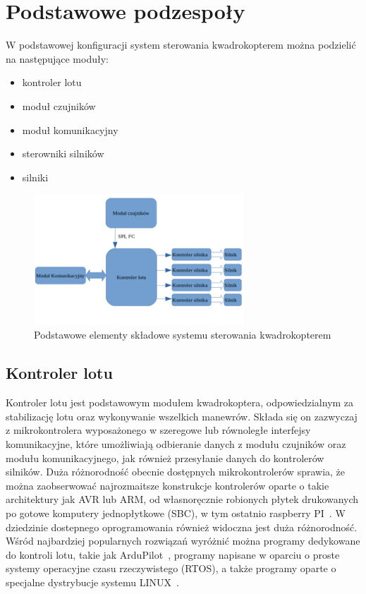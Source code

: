 \section{Podstawowe podzespoły}

W podstawowej konfiguracji system sterowania kwadrokopterem można podzielić na następujące moduły:
\begin{itemize}
	\item{kontroler lotu}
	\item{moduł czujników}
	\item{moduł komunikacyjny}
	\item{sterowniki silników}
	\item{silniki}
\end{itemize}

\begin{figure}[H]
	\centering
		\includegraphics[width=0.7\textwidth]{Pictures/quadrotor_modules.png}
	\caption[Podstawowe moduły kwawdrokoptera]{Podstawowe elementy składowe systemu sterowania kwadrokopterem}
	\label{fig:quadrotor_modules.png}
\end{figure}

\subsection{Kontroler lotu}

Kontroler lotu jest podstawowym modułem kwadrokoptera, odpowiedzialnym za stabilizację lotu oraz wykonywanie wszelkich manewrów. Składa się on zazwyczaj z mikrokontrolera wyposażonego w szeregowe lub równoległe interfejsy komunikacyjne, które umożliwiają odbieranie danych z modułu czujników oraz modułu komunikacyjnego, jak również przesyłanie danych do kontrolerów silników. Duża różnorodność obecnie dostępnych mikrokontrolerów sprawia, że można zaobserwować najrozmaitsze konstrukcje kontrolerów oparte o takie architektury jak AVR lub ARM, od własnoręcznie robionych płytek drukowanych po gotowe komputery jednopłytkowe (SBC), w tym ostatnio raspberry PI~\cite{quadro12, quadro13}. W dziedzinie dostepnego oprogramowania również widoczna jest duża różnorodność. Wśród najbardziej popularnych rozwiązań wyróżnić można programy dedykowane do kontroli lotu, takie jak ArduPilot~\cite{quadro14}, programy napisane w oparciu o proste systemy operacyjne czasu rzeczywistego (RTOS), a także programy oparte o specjalne dystrybucje systemu LINUX~\cite{quadro15}.


